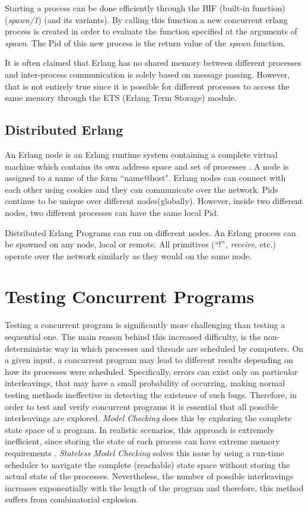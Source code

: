 Starting a process can be done efficiently through the BIF (built-in function) (\textit{spawn/1})
(and its variants).
By calling this function a new concurrent erlang process is created in order to evaluate the function
specified at the arguments of \textit{spawn}. The Pid of this new process is the return value of the \textit{spawn}
function.

It is often claimed that Erlang has no shared memory between different processes \cite{Armstrong:2007:PES:1403889}
and inter-process communication is solely based on
message passing. However, that is not entirely true since it is possible for different processes to
access the same memory through the ETS (Erlang Term Storage) module.

\subsection{Distributed Erlang}

An Erlang node is an Erlang runtime system containing a complete virtual machine which contains its
own address space and set of processes \cite{Armstrong:2007:PES:1403889}. A node is assigned to a name of
the form ``name@host". Erlang nodes can connect with each other using cookies and they can communicate
over the network. Pids continue to be unique over different nodes(globally). However, inside
two different nodes, two different processes can have the same local Pid.

Distributed Erlang Programs can run on different nodes. An Erlang process can be spawned on any 
node, local or remote. All primitives ($``!"$, \textit{receive}, etc.) operate over the network similarly as they
would on the same node.

\section{Testing Concurrent Programs}

Testing a concurrent program is significantly more challenging than testing a sequential one.
The main reason behind this increased difficulty, is the non-deterministic way in which processes and
threads are scheduled by computers. On a given input, a concurrent program may lead to different 
results depending on how its processes were scheduled. Specifically, errors can exist only on particular
interleavings, that may have a small probability of occurring, making normal testing methods ineffective in
detecting the existence of such bugs. Therefore, in order to test and verify concurrent programs it is
essential that all possible interleavings are explored. \textit{Model Checking} does this by exploring the
complete state space of a program. In realistic scenarios, this approach is extremely inefficient, since
storing the state of each process can have extreme memory requirements \cite{Godefroid:1997:MCP:263699.263717}.
\textit{Stateless Model
Checking} solves this issue by using a run-time scheduler to navigate the complete (reachable) state space 
without storing
the actual state of the processes. Nevertheless, the number of possible interleavings increases
exponentially with the length of the program and therefore, this method suffers from combinatorial explosion.

